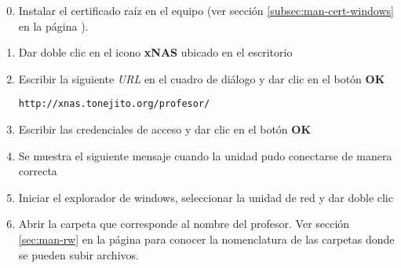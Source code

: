 {
\linespread{0.1}
\begin{enumerate}
\setcounter{enumi}{-1} %

  \item Instalar el certificado ra\'{i}z en el equipo (ver secci\'{o}n \ref{subsec:man-cert-windows} en la p\'{a}gina \pageref{subsec:man-cert-windows}).

  \item Dar doble clic en el icono \textbf{xNAS} ubicado en el escritorio


  \item Escribir la siguiente \textit{URL} en el cuadro de di\'{a}logo y dar clic en el bot\'{o}n \textbf{OK}

    \texttt{http://xnas.tonejito.org/profesor/}


  \item Escribir las credenciales de acceso y dar clic en el bot\'{o}n \textbf{OK}


  \item Se muestra el siguiente mensaje cuando la unidad pudo conectarse de manera correcta


  \item Iniciar el explorador de windows, seleccionar la unidad de red y dar doble clic


  \item Abrir la carpeta que corresponde al nombre del profesor. Ver secci\'{o}n \ref{sec:man-rw} en la p\'{a}gina \pageref{sec:man-rw} para conocer la nomenclatura de las carpetas donde se pueden subir archivos.


%

\end{enumerate}
}

